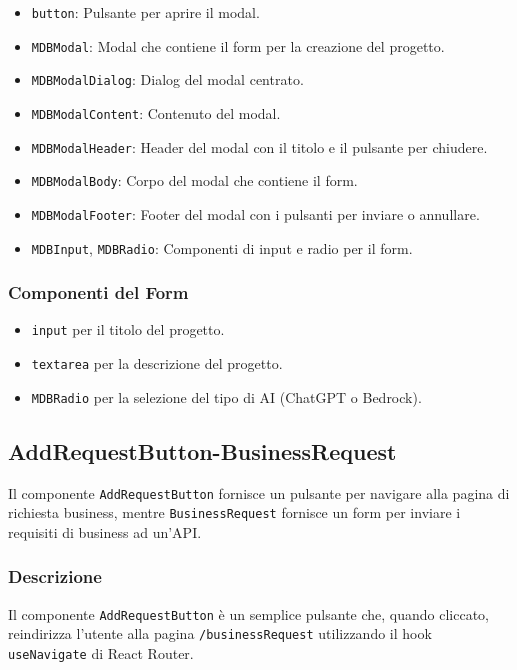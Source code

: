 \documentclass{article}
\begin{document}
\begin{itemize}
    \item \texttt{button}: Pulsante per aprire il modal.
    \item \texttt{MDBModal}: Modal che contiene il form per la creazione del progetto.
    \item \texttt{MDBModalDialog}: Dialog del modal centrato.
    \item \texttt{MDBModalContent}: Contenuto del modal.
    \item \texttt{MDBModalHeader}: Header del modal con il titolo e il pulsante per chiudere.
    \item \texttt{MDBModalBody}: Corpo del modal che contiene il form.
    \item \texttt{MDBModalFooter}: Footer del modal con i pulsanti per inviare o annullare.
    \item \texttt{MDBInput}, \texttt{MDBRadio}: Componenti di input e radio per il form.
\end{itemize}

\subsubsection*{Componenti del Form}

\begin{itemize}
    \item \texttt{input} per il titolo del progetto.
    \item \texttt{textarea} per la descrizione del progetto.
    \item \texttt{MDBRadio} per la selezione del tipo di AI (ChatGPT o Bedrock).
\end{itemize}

\subsection*{AddRequestButton-BusinessRequest}
 Il componente  \texttt{AddRequestButton} fornisce un pulsante per navigare alla pagina di richiesta business, mentre \texttt{BusinessRequest} fornisce un form per inviare i requisiti di business ad un'API.


\subsubsection*{Descrizione}

Il componente \texttt{AddRequestButton} è un semplice pulsante che, quando cliccato, reindirizza l'utente alla pagina \texttt{/businessRequest} utilizzando il hook \texttt{useNavigate} di React Router.
\end{document}
